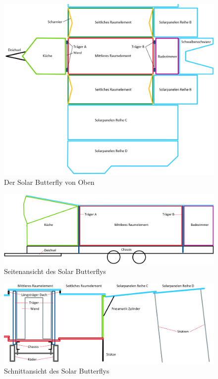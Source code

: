 \begin{figure}[H]
  \includegraphics[width=\linewidth]{04_Figures/SB1.png}
  \caption{Der Solar Butterfly von Oben}
  \label{img:SB1}
\end{figure}

\begin{figure}[H]
  \includegraphics[width=\linewidth]{04_Figures/SB3.png}
  \caption{Seitenansicht des Solar Butterflys}
  \label{img:SB3}
\end{figure}

\begin{figure}[H]
  \includegraphics[width=\linewidth]{04_Figures/SB2.png}
  \caption{Schnittansicht des Solar Butterflys}
  \label{img:SB2}
\end{figure}

